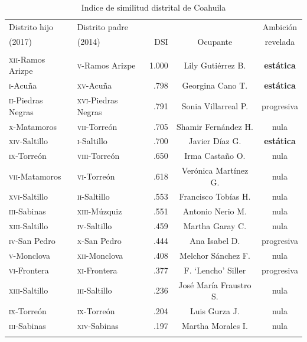 \documentclass[letter,12pt]{article}
\begin{document}
\begin{table}
  \centering
\begin{tabular}{llrcc}
 Distrito hijo               &  Distrito padre             &       &          & Ambición  \\ [-.5ex]
 (2017)                      &  (2014)                     &  DSI  & Ocupante & revelada \\ \hline
\\ [-1.2ex]
 \textsc{xii}-Ramos Arizpe   & \textsc{v}-Ramos Arizpe     & 1.000 & Lily Gutiérrez B.      & \textbf{estática} \\
 \textsc{i}-Acuña            & \textsc{xv}-Acuña           &  .798 & Georgina Cano T.       & \textbf{estática} \\ 
 \textsc{ii}-Piedras Negras  & \textsc{xvi}-Piedras Negras &  .791 & Sonia Villarreal P.    & progresiva        \\ 
 \textsc{x}-Matamoros        & \textsc{vii}-Torreón        &  .705 & Shamir Fernández H.    & nula              \\ 
 \textsc{xiv}-Saltillo       & \textsc{i}-Saltillo         &  .700 & Javier Díaz G.         & \textbf{estática} \\ 
 \textsc{ix}-Torreón         & \textsc{viii}-Torreón       &  .650 & Irma Castaño O.        & nula              \\ 
 \textsc{vii}-Matamoros      & \textsc{vi}-Torreón         &  .618 & Verónica Martínez G.   & nula              \\ 
 \textsc{xvi}-Saltillo       & \textsc{ii}-Saltillo        &  .553 & Francisco Tobías H.    & nula              \\ 
 \textsc{iii}-Sabinas        & \textsc{xiii}-Múzquiz       &  .551 & Antonio Nerio M.       & nula              \\ 
 \textsc{xiii}-Saltillo      & \textsc{iv}-Saltillo        &  .459 & Martha Garay C.        & nula              \\ 
 \textsc{iv}-San Pedro       & \textsc{x}-San Pedro        &  .444 & Ana Isabel D.          & progresiva        \\ 
 \textsc{v}-Monclova         & \textsc{xii}-Monclova       &  .408 & Melchor Sánchez F.     & nula              \\ 
 \textsc{vi}-Frontera        & \textsc{xi}-Frontera        &  .377 & F. `Lencho' Siller     & progresiva        \\ 
 \textsc{xiii}-Saltillo      & \textsc{iii}-Saltillo       &  .236 & José María Fraustro S. & nula              \\ 
 \textsc{ix}-Torreón         & \textsc{ix}-Torreón         &  .204 & Luis Gurza J.          & nula              \\ 
 \textsc{iii}-Sabinas        & \textsc{xiv}-Sabinas        &  .197 & Martha Morales I.      & nula              \\ 
 \\ [-1.2ex] \hline
\end{tabular}
\caption{Indice de similitud distrital de Coahuila}\label{T:dsi}
\end{table}
\end{document}
